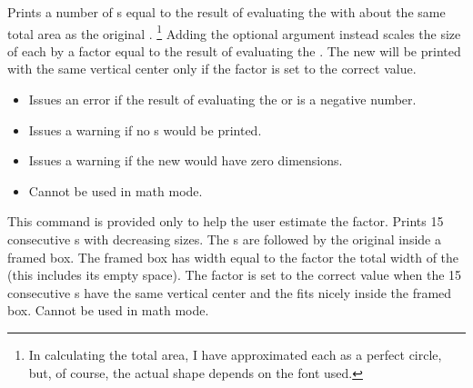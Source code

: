 \documentclass{beerydoc}
\begin{document}
\begin{function}{\scaletextbullets}
  \begin{syntax}
      
  \end{syntax}
  Prints a number of s equal to the result of evaluating the
   with about the same total area as the original
  .%
  \footnote
    {%
      In calculating the total area, I have approximated each 
      as a perfect circle, but, of course, the actual shape depends on the font
      used.%
    }
  Adding the optional argument instead scales the size of each 
  by a factor equal to the result of evaluating the .
  The new  will be printed with the same vertical center only
  if the  factor is set to the correct value.

  \begin{itemize}
    \item
    Issues an error if the result of evaluating the  or
     is a negative number.
    \item
    Issues a warning if no s would be printed.
    \item
    Issues a warning if the new  would have zero dimensions.
    \item
    Cannot be used in math mode.
  \end{itemize}
\end{function}

\begin{function}{\scaletextbulletdebug}
  \begin{syntax}
  \end{syntax}
  This command is provided only to help the user estimate the 
  factor.
  Prints \num{15} consecutive s with decreasing sizes.
  The s are followed by the original  inside a
  framed box.
  The framed box has width equal to the  factor \texttimes{}
  the total width of the  (this includes its empty space).
  The  factor is set to the correct value when the \num{15}
  consecutive s have the same vertical center and the
   fits nicely inside the framed box.
  Cannot be used in math mode.
\end{function}
\end{document}
